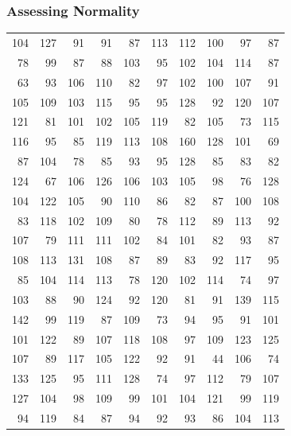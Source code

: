\documentclass[xcolor=dvipsnames]{beamer}
\begin{document}
\begin{frame}
  \frametitle{Assessing Normality}
\begin{footnotesize}
\begin{tabular}{|rrrrrrrrrr|}\hline
104 & 127 & 91  & 91  & 87  & 113 & 112 & 100 & 97  & 87  \\
78  & 99  & 87  & 88  & 103 & 95  & 102 & 104 & 114 & 87  \\
63  & 93  & 106 & 110 & 82  & 97  & 102 & 100 & 107 & 91  \\
105 & 109 & 103 & 115 & 95  & 95  & 128 & 92  & 120 & 107 \\
121 & 81  & 101 & 102 & 105 & 119 & 82  & 105 & 73  & 115 \\
116 & 95  & 85  & 119 & 113 & 108 & 160 & 128 & 101 & 69  \\
87  & 104 & 78  & 85  & 93  & 95  & 128 & 85  & 83  & 82  \\
124 & 67  & 106 & 126 & 106 & 103 & 105 & 98  & 76  & 128 \\
104 & 122 & 105 & 90  & 110 & 86  & 82  & 87  & 100 & 108 \\
83  & 118 & 102 & 109 & 80  & 78  & 112 & 89  & 113 & 92  \\
107 & 79  & 111 & 111 & 102 & 84  & 101 & 82  & 93  & 87  \\
108 & 113 & 131 & 108 & 87  & 89  & 83  & 92  & 117 & 95  \\
85  & 104 & 114 & 113 & 78  & 120 & 102 & 114 & 74  & 97  \\
103 & 88  & 90  & 124 & 92  & 120 & 81  & 91  & 139 & 115 \\
142 & 99  & 119 & 87  & 109 & 73  & 94  & 95  & 91  & 101 \\
101 & 122 & 89  & 107 & 118 & 108 & 97  & 109 & 123 & 125 \\
107 & 89  & 117 & 105 & 122 & 92  & 91  & 44  & 106 & 74  \\
133 & 125 & 95  & 111 & 128 & 74  & 97  & 112 & 79  & 107 \\
127 & 104 & 98  & 109 & 99  & 101 & 104 & 121 & 99  & 119 \\
94  & 119 & 84  & 87  & 94  & 92  & 93  & 86  & 104 & 113 \\ \hline
\end{tabular}
\end{footnotesize}
\end{frame}
\end{document}
